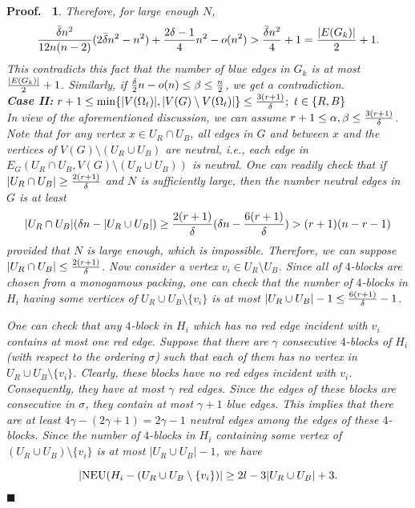\documentclass[11pt]{article}
\newtheorem{preproof}{{\bf Proof.\ }}
\newenvironment{proof}[1]{\begin{preproof}{\rm
               #1}\hfill{$\blacksquare$}}{\end{preproof}}
\begin{document}
\begin{proof}
{Therefore, for large enough $N$, 
$${\bar{\delta}n^2\over 12n(n-2)}(2\bar{\delta}n^2-n^2)+{2\delta -1 \over 4}n^2-o(n^2) > {\bar{\delta}n^2\over 4}+1={|E(G_k)|\over 2}+1.$$
This contradicts this fact that the number of blue edges in $G_k$ is at most ${|E(G_k)|\over 2}+1$. 
Similarly, if ${\delta\over 2}n-o(n)\leq \beta\leq {n\over 2}$, we get a contradiction.\\

{\bf Case II:} $r+1 \leq \min\{|V(\Omega_t)|, |V(G) \setminus V(\Omega_t)|\} \leq {3(r+1)\over \delta};\ t\in \{R,B\}$\\
In view of the aforementioned discussion, we can assume $r+1\leq \alpha, \beta \leq {3(r+1)\over \delta}$.
Note that for any vertex $x\in U_R\cap U_B$, all edges in $G$ and between $x$ and the vertices of 
$V(G)\setminus (U_R\cup U_B)$ are neutral, i.e., each edge in $E_{G}(U_R\cap U_B, V(G)\setminus (U_R\cup U_B))$ is neutral.
One can readily check that if $|U_R\cap U_B|\geq{2(r+1)\over\delta}$ and $N$ is sufficiently large,  
then the number neutral edges in $G$ is at least 
$$|U_R\cap U_B|(\delta n-|U_R\cup U_B|)\geq {2(r+1)\over \delta}(\delta n-{6(r+1)\over\delta})>(r+1)(n-r-1)$$ 
provided that $N$ is large enough, 
which is impossible. Therefore, we can suppose $|U_R\cap U_B|\leq {2(r+1)\over \delta}$. 
Now consider a vertex $v_i\in U_R\setminus U_B$.
Since all of $4$-blocks are chosen from a monogamous packing, one can check that the number of $4$-blocks in $H_i$ having some vertices of $U_R\cup U_B\setminus \{v_i\}$ is at most $|U_R\cup U_B|-1\leq {6(r+1)\over \delta}-1$. 

One can check that any $4$-block in $H_i$ which has no red edge incident with $v_i$ contains at most one red edge. 
Suppose that there are $\gamma$ consecutive $4$-blocks of $H_i$ (with respect to the ordering $\sigma$) such that 
each of them has no vertex in $U_R\cup U_B\setminus \{v_i\}$. Clearly, these blocks have no red edges 
incident with $v_i$. Consequently, they have at most $\gamma$ red edges. 
Since the edges of these blocks are consecutive in $\sigma$, they contain at most $\gamma+1$ blue edges. This implies that there are at least $4\gamma-(2\gamma+1)=2\gamma-1$ neutral edges among the edges of these $4$-blocks. Since the number of $4$-blocks in $H_i$ containing some vertex of $(U_R\cup U_B)\setminus \{v_i\}$ is at most $|U_R\cup U_B|-1$, we have 

\begin{equation}\label{neuedgezi}
|{\rm NEU}(H_i-(U_R\cup U_B\setminus\{v_i\})|\geq 2l-3|U_R\cup U_B|+3. 
\end{equation}


}
\end{proof}
\end{document}

